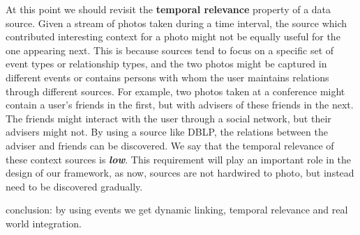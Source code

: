 At this point we should revisit the \textbf{temporal relevance} property of a data source. Given a stream of photos taken during a time interval, the source which contributed interesting context for a photo might not be equally useful for the one appearing next. This is because sources tend to focus on a specific set of event types or relationship types, and the two photos might be captured in different events or contains persons with whom the user maintains relations through different sources. For example, two photos taken at a conference might contain a user's friends in the first, but with advisers of these friends in the next. The friends might interact with the user through a social network, but their advisers might not. By using a source like DBLP, the relations between the adviser and friends can be discovered. We say that the temporal relevance of these context sources is \textbf{\textit{low}}. This requirement will play an important role in the design of our framework, as now, sources are not hardwired to photo, but instead need to be discovered gradually.

conclusion: by using events we get dynamic linking, temporal relevance and real world integration.




